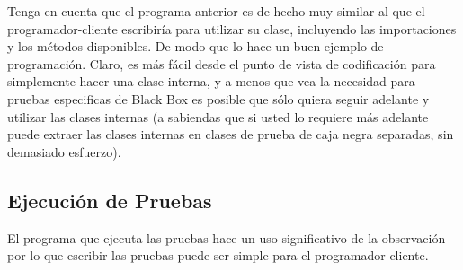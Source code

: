 Tenga en cuenta que el programa anterior es de hecho muy similar al que el programador-cliente escribiría para utilizar su clase, incluyendo las importaciones y los métodos disponibles. De modo que lo hace un buen ejemplo de programación. Claro, es más fácil desde el punto de vista de codificación para simplemente hacer una clase interna, y a menos que vea la necesidad para pruebas especificas de Black Box es posible que sólo quiera seguir adelante y utilizar las clases internas (a sabiendas que si usted lo requiere más adelante puede extraer las clases internas en clases de prueba de caja negra separadas, sin demasiado esfuerzo).

\subsection*{Ejecución de Pruebas}
\label{subsec:edp}


El programa que ejecuta las pruebas hace un uso significativo de la observación por lo que escribir las pruebas puede ser simple para el programador cliente.    \newline

